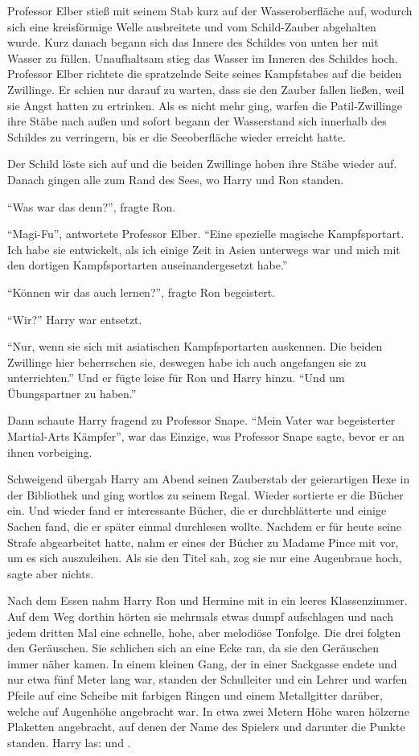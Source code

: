 Professor Elber stieß mit seinem Stab kurz auf der Wasseroberfläche auf, wodurch sich eine kreisförmige Welle ausbreitete und vom Schild-Zauber abgehalten wurde. Kurz danach begann sich das Innere des Schildes von unten her mit Wasser zu füllen. Unaufhaltsam stieg das Wasser im Inneren des Schildes hoch. Professor Elber richtete die spratzelnde Seite seines Kampfstabes auf die beiden Zwillinge. Er schien nur darauf zu warten, dass sie den Zauber fallen ließen, weil sie Angst hatten zu ertrinken. Als es nicht mehr ging, warfen die Patil-Zwillinge ihre Stäbe nach außen und sofort begann der Wasserstand sich innerhalb des Schildes zu verringern, bis er die Seeoberfläche wieder erreicht hatte.

Der Schild löste sich auf und die beiden Zwillinge hoben ihre Stäbe wieder auf. Danach gingen alle zum Rand des Sees, wo Harry und Ron standen.

\enquote{Was war das denn?}, fragte Ron.

\enquote{Magi-Fu}, antwortete Professor Elber. \enquote{Eine spezielle magische Kampfsportart. Ich habe sie entwickelt, als ich einige Zeit in Asien unterwegs war und mich mit den dortigen Kampfsportarten auseinandergesetzt habe.}

\enquote{Können wir das auch lernen?}, fragte Ron begeistert.

\enquote{Wir?} Harry war entsetzt.

\enquote{Nur, wenn sie sich mit asiatischen Kampfsportarten auskennen. Die beiden Zwillinge hier beherrschen sie, deswegen habe ich auch angefangen sie zu unterrichten.} Und er fügte leise für Ron und Harry hinzu. \enquote{Und um Übungspartner zu haben.}

Dann schaute Harry fragend zu Professor Snape. \enquote{Mein Vater war begeisterter Martial-Arts Kämpfer}, war das Einzige, was Professor Snape sagte, bevor er an ihnen vorbeiging.

\trenn

Schweigend übergab Harry am Abend seinen Zauberstab der geierartigen Hexe in der Bibliothek und ging wortlos zu seinem Regal. Wieder sortierte er die Bücher ein. Und wieder fand er interessante Bücher, die er durchblätterte und einige Sachen fand, die er später einmal durchlesen wollte. Nachdem er für heute seine Strafe abgearbeitet hatte, nahm er eines der Bücher zu Madame Pince mit vor, um es sich auszuleihen. Als sie den Titel sah, zog sie nur eine Augenbraue hoch, sagte aber nichts.

Nach dem Essen nahm Harry Ron und Hermine mit in ein leeres Klassenzimmer. Auf dem Weg dorthin hörten sie mehrmals etwas dumpf aufschlagen und nach jedem dritten Mal eine schnelle, hohe, aber melodiöse Tonfolge. Die drei folgten den Geräuschen. Sie schlichen sich an eine Ecke ran, da sie den Geräuschen immer näher kamen. In einem kleinen Gang, der in einer Sackgasse endete und nur etwa fünf Meter lang war, standen der Schulleiter und ein Lehrer und warfen Pfeile auf eine Scheibe mit farbigen Ringen und einem Metallgitter darüber, welche auf Augenhöhe angebracht war. In etwa zwei Metern Höhe waren hölzerne Plaketten angebracht, auf denen der Name des Spielers und darunter die Punkte standen. Harry las:  und .


